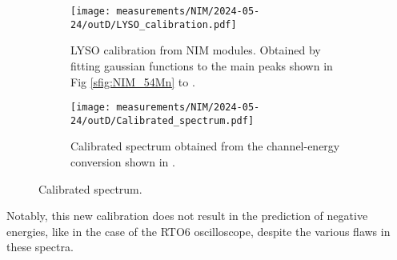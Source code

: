 \begin{figure}[H]
  \begin{subfigure}[t]{\textwidth}
    \centering
    \texttt{[image: measurements/NIM/2024-05-24/outD/LYSO\_calibration.pdf]}
    \caption{\label{sfig:NIM_LYSO_calibration}LYSO calibration from NIM modules. Obtained by fitting gaussian functions to the main peaks shown in Fig \ref{sfig:NIM_54Mn} to .}
  \end{subfigure}
  \medskip
  \begin{subfigure}[t]{\textwidth}
    \centering
    \texttt{[image: measurements/NIM/2024-05-24/outD/Calibrated\_spectrum.pdf]}
    \caption{\label{sfig:NIM_LYSO_calibrated_spectrum}Calibrated spectrum obtained from the channel-energy conversion shown in .}
  \end{subfigure}
  \caption{\label{fig:NIM_calibration}Calibrated spectrum.}
\end{figure}

Notably, this new calibration does not result in the prediction of negative energies, like in the case of the RTO6 oscilloscope, despite the various flaws in these spectra.